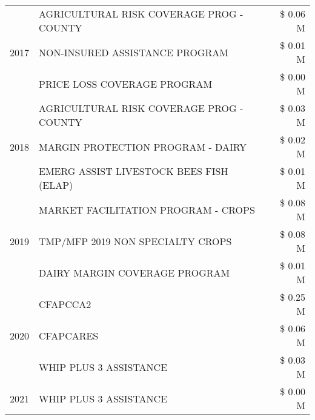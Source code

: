 \begin{tabular}{llr}
\cline{1-3}
\multirow[t]{3}{*}{2017} & AGRICULTURAL RISK COVERAGE PROG - COUNTY & \$ 0.06 M \\
 & NON-INSURED ASSISTANCE PROGRAM & \$ 0.01 M \\
 & PRICE LOSS COVERAGE PROGRAM & \$ 0.00 M \\
\cline{1-3}
\multirow[t]{3}{*}{2018} & AGRICULTURAL RISK COVERAGE PROG - COUNTY & \$ 0.03 M \\
 & MARGIN PROTECTION PROGRAM - DAIRY & \$ 0.02 M \\
 & EMERG ASSIST LIVESTOCK BEES FISH (ELAP) & \$ 0.01 M \\
\cline{1-3}
\multirow[t]{3}{*}{2019} & MARKET FACILITATION PROGRAM - CROPS & \$ 0.08 M \\
 & TMP/MFP 2019 NON SPECIALTY CROPS & \$ 0.08 M \\
 & DAIRY MARGIN COVERAGE PROGRAM & \$ 0.01 M \\
\cline{1-3}
\multirow[t]{3}{*}{2020} & CFAPCCA2 & \$ 0.25 M \\
 & CFAPCARES & \$ 0.06 M \\
 & WHIP PLUS 3 ASSISTANCE & \$ 0.03 M \\
\cline{1-3}
2021 & WHIP PLUS 3 ASSISTANCE & \$ 0.00 M \\
\cline{1-3}
\bottomrule
\end{tabular}
